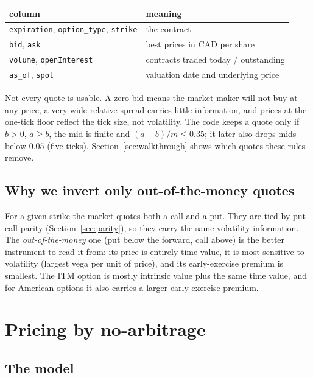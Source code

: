 \documentclass[11pt]{article}
\begin{document}
\begin{center}\small
\begin{tabular}{|l|L{9.6cm}|}
\hline
column & meaning \\ \hline
\texttt{expiration}, \texttt{option\_type}, \texttt{strike} & the contract \\ \hline
\texttt{bid}, \texttt{ask} & best prices in CAD per share \\ \hline
\texttt{volume}, \texttt{openInterest} & contracts traded today / outstanding \\ \hline
\texttt{as\_of}, \texttt{spot} & valuation date and underlying price \\ \hline
\end{tabular}
\end{center}

Not every quote is usable. A zero bid means the market maker will not buy at any
price, a very wide relative spread carries little information, and prices at the
one-tick floor reflect the tick size, not volatility. The code keeps a quote only
if $b>0$, $a\ge b$, the mid is finite and $(a-b)/m\le 0.35$; it later also drops
mids below $0.05$ (five ticks). Section~\ref{sec:walkthrough} shows which quotes
these rules remove.

\subsection{Why we invert only out-of-the-money quotes}

For a given strike the market quotes both a call and a put. They are tied by
put-call parity (Section~\ref{sec:parity}), so they carry the same volatility
information. The \emph{out-of-the-money} one (put below the forward, call above)
is the better instrument to read it from: its price is entirely time value, it
is most sensitive to volatility (largest vega per unit of price), and its
early-exercise premium is smallest. The ITM option is mostly intrinsic value
plus the same time value, and for American options it also carries a larger
early-exercise premium.

\section{Pricing by no-arbitrage}\label{sec:pricing}

\subsection{The model}
\end{document}
